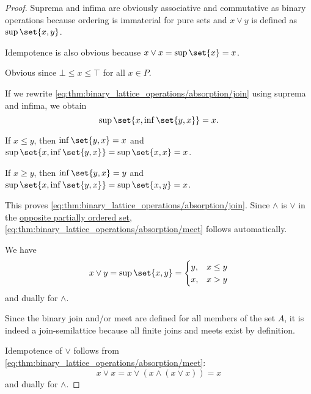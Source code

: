 \begin{proof}
   Suprema and infima are obviously associative and commutative as binary operations because ordering is immaterial for pure sets and \( x \vee y \) is defined as \( \sup\set{ x, y } \).

  Idempotence is also obvious because \( x \vee x = \sup\set{ x } = x \).

   Obvious since \( \bot \leq x \leq \top \) for all \( x \in P \).

   If we rewrite \eqref{eq:thm:binary_lattice_operations/absorption/join} using suprema and infima, we obtain
  \begin{equation*}
    \sup\set{ x, \inf\set{ y, x } } = x.
  \end{equation*}

  If \( x \leq y \), then \( \inf\set{ y, x } = x \) and \( \sup\set{ x, \inf\set{ y, x } } = \sup\set{ x, x } = x \).

  If \( x \geq y \), then \( \inf\set{ y, x } = y \) and \( \sup\set{ x, \inf\set{ y, x } } = \sup\set{ x, y } = x \).

  This proves \eqref{eq:thm:binary_lattice_operations/absorption/join}. Since \( \wedge \) is \( \vee \) in the \hyperref[def:preordered_set/duality]{opposite partially ordered set}, \eqref{eq:thm:binary_lattice_operations/absorption/meet} follows automatically.

   We have
  \begin{equation*}
    x \vee y
    =
    \sup\set{ x, y }
    =
    \begin{cases}
      y, &x \leq y \\
      x, &x > y
    \end{cases}
  \end{equation*}
  and dually for \( \wedge \).

   Since the binary join and/or meet are defined for all members of the set \( A \), it is indeed a join-semilattice because all finite joins and meets exist by definition.

  Idempotence of \( \vee \) follows from \eqref{eq:thm:binary_lattice_operations/absorption/meet}:
  \begin{equation*}
    x \vee x = x \vee (x \wedge (x \vee x)) = x
  \end{equation*}
  and dually for \( \wedge \).
\end{proof}

